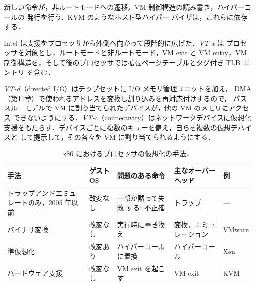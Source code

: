 \documentclass[../main.tex]{subfiles}
\begin{document}
新しい命令が，非ルートモードへの遷移，VM 制御構造の読み書き，ハイパーコールの
発行を行う．KVM のようなホスト型ハイパー
バイザは，これらに依存する．

Intel は支援をプロセッサから外側へ向かって段階的に広げた．\emph{VT-x} は
プロセッサを対象とし，ルートモードと非ルートモード，VM exit と VM entry，VM
制御構造を，そして後のプロセッサでは拡張ページテーブルとタグ付き TLB エントリ
を含む．%

\emph{VT-d}（directed I/O）はチップセットに I/O メモリ管理ユニットを加え，
DMA（第11章）で使われるアドレスを変換し割り込みを再対応付けするので，
パススルーモデルで VM に割り当てられたデバイスが，他の VM のメモリにアクセス
できないようにする．\emph{VT-c}（connectivity）はネットワークデバイスに仮想化
支援をもたらす．デバイスごとに複数のキューを備え，自らを複数の仮想デバイスと
して提示して，その各々を VM に割り当てられるようにする．

\begin{table}[htbp]
  \centering
  \caption{x86 におけるプロセッサの仮想化の手法．}
  \label{tab:l12-cpu}
  \small
  \begin{tabular}{@{}>{\raggedright}p{24mm}>{\raggedright}p{16mm}%
      >{\raggedright}p{27mm}>{\raggedright}p{22mm}%
      >{\raggedright\arraybackslash}p{14mm}@{}}
    \toprule
    手法 & ゲスト OS & 問題のある命令 & 主なオーバーヘッド & 例 \\
    \midrule
    トラップアンドエミュレートのみ，2005 年以前 & 改変なし & 一部が黙って失敗
      する: 不正確 & トラップ & --- \\
    \addlinespace
    バイナリ変換 & 改変なし & 実行時に書き換え & 変換，エミュレーション
      & VMware \\
    \addlinespace
    準仮想化 & 改変あり & ハイパーコールに置換 & ハイパーコール & Xen \\
    \addlinespace
    ハードウェア支援 & 改変なし & VM exit を起こす & VM exit & KVM \\
    \bottomrule
  \end{tabular}
\end{table}
\end{document}
